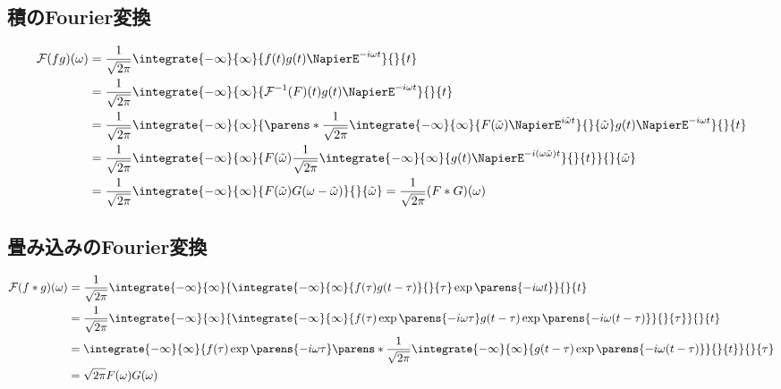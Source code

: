         \subsection{積のFourier変換}
            \begin{align*}
                \mathcal{F}(fg)(\omega) &= \frac{1}{\sqrt{2\pi}}\integrate{-\infty}{\infty}{f(t)g(t)\NapierE^{-i\omega t}}{}{t} \\
                &= \frac{1}{\sqrt{2\pi}}\integrate{-\infty}{\infty}{\mathcal{F}^{-1}(F)(t)g(t)\NapierE^{-i\omega t}}{}{t} \\
                &= \frac{1}{\sqrt{2\pi}}\integrate{-\infty}{\infty}{\parens*{\frac{1}{\sqrt{2\pi}}\integrate{-\infty}{\infty}{F(\tilde{\omega})\NapierE^{i\tilde{\omega}t}}{}{\tilde{\omega}}}g(t)\NapierE^{-i\omega t}}{}{t} \\
                &= \frac{1}{\sqrt{2\pi}}\integrate{-\infty}{\infty}{F(\tilde{\omega})\frac{1}{\sqrt{2\pi}}\integrate{-\infty}{\infty}{g(t)\NapierE^{-i(\omega\tilde{\omega})t}}{}{t}}{}{\tilde{\omega}} \\
                &= \frac{1}{\sqrt{2\pi}}\integrate{-\infty}{\infty}{F(\tilde{\omega})G(\omega-\tilde{\omega})}{}{\tilde{\omega}} = \frac{1}{\sqrt{2\pi}}(F*G)(\omega)
            \end{align*}
        \subsection{畳み込みのFourier変換}
            \begin{align*}
                \mathcal{F}(f*g)(\omega) &= \frac{1}{\sqrt{2\pi}}\integrate{-\infty}{\infty}{\integrate{-\infty}{\infty}{f(\tau)g(t-\tau)}{}{\tau}\exp\parens{-i\omega t}}{}{t} \\
                &= \frac{1}{\sqrt{2\pi}}\integrate{-\infty}{\infty}{\integrate{-\infty}{\infty}{f(\tau)\exp\parens{-i\omega\tau}g(t-\tau)\exp\parens{-i\omega (t-\tau)}}{}{\tau}}{}{t} \\
                &= \integrate{-\infty}{\infty}{f(\tau)\exp\parens{-i\omega\tau}\parens*{\frac{1}{\sqrt{2\pi}}\integrate{-\infty}{\infty}{g(t-\tau)\exp\parens{-i\omega (t-\tau)}}{}{t}}}{}{\tau} \\
                &= \sqrt{2\pi}F(\omega)G(\omega)
            \end{align*}